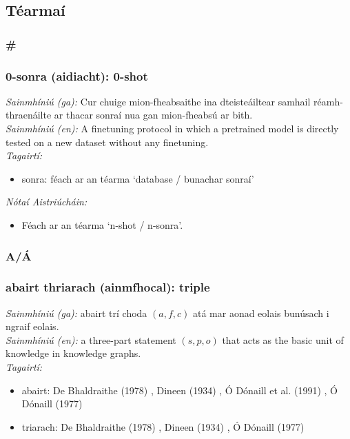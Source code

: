 \newpage \subsection{Téarmaí}
 \subsubsection*{\#}

\subsubsection*{0-sonra (aidiacht): 0-shot}
 \noindent \textit{Sainmhíniú (ga):} Cur chuige mion-fheabsaithe ina dteisteáiltear samhail réamh-thraenáilte ar thacar sonraí nua gan mion-fheabsú ar bith.
\\
 \noindent \textit{Sainmhíniú (en):} A finetuning protocol in which a pretrained model is directly tested on a new dataset without any finetuning.
\\
 \noindent \textit{Tagairtí:}
\begin{itemize}
	\item sonra: féach ar an téarma `database / bunachar sonraí'
\end{itemize}

 \noindent \textit{Nótaí Aistriúcháin:}
\begin{itemize}
	\item Féach ar an téarma `n-shot / n-sonra'.
\end{itemize}


 \subsubsection*{A/Á}

\subsubsection*{abairt thriarach (ainmfhocal): triple}
 \noindent \textit{Sainmhíniú (ga):} abairt trí choda $(a,f,c)$ atá mar aonad eolais bunúsach i ngraif eolais.
\\
 \noindent \textit{Sainmhíniú (en):} a three-part statement $(s,p,o)$ that acts as the basic unit of knowledge in knowledge graphs.
\\
 \noindent \textit{Tagairtí:}
\begin{itemize}
	\item abairt: De Bhaldraithe (1978) \cite{de-bhaldraithe}, Dineen (1934) \cite{dineen}, Ó Dónaill et al. (1991) \cite{focloir-beag}, Ó Dónaill (1977) \cite{odonaill}
	\item triarach: De Bhaldraithe (1978) \cite{de-bhaldraithe}, Dineen (1934) \cite{dineen}, Ó Dónaill (1977) \cite{odonaill}
\end{itemize}

